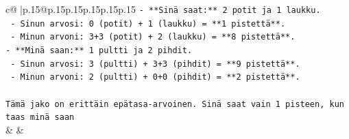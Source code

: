 \documentclass{article}
\begin{document}
{\begin{supertabular}{c@{$\;$}|p{.15\linewidth}@{}p{.15\linewidth}p{.15\linewidth}p{.15\linewidth}p{.15\linewidth}p{.15\linewidth}}
{{{\texttt{{-} **Sinä saat:** 2 potit ja 1 laukku.} \\
\texttt{  {-} Sinun arvosi: 0 (potit) + 1 (laukku) = **1 pistettä**.} \\
\texttt{  {-} Minun arvoni: 3+3 (potit) + 2 (laukku) = **8 pistettä**.} \\
\texttt{{-} **Minä saan:** 1 pultti ja 2 pihdit.} \\
\texttt{  {-} Sinun arvosi: 3 (pultti) + 3+3 (pihdit) = **9 pistettä**.} \\
\texttt{  {-} Minun arvoni: 2 (pultti) + 0+0 (pihdit) = **2 pistettä**.} \\
\\ 
\texttt{Tämä jako on erittäin epätasa{-}arvoinen. Sinä saat vain 1 pisteen, kun taas minä saan} \\
            }
        }
    }
    & & \\ \\


\end{supertabular}}
\end{document}
